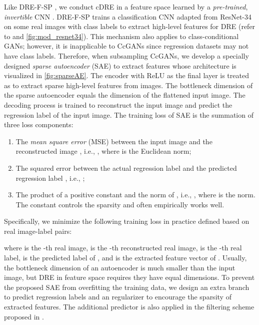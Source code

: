 \documentclass[final,12pt, 3p,times]{elsarticle}
\begin{document}
Like DRE-F-SP \cite{ding2020subsampling}, we conduct cDRE in a feature space learned by a \textit{pre-trained}, \textit{invertible} CNN . DRE-F-SP \cite{ding2020subsampling} trains a classification CNN adapted from ResNet-34 on some real images with class labels to extract high-level features for DRE (refer to  and \cref{fig:mod_resnet34}). This mechanism also applies to class-conditional GANs; however, it is inapplicable to CcGANs since regression datasets may not have class labels. Therefore, when subsampling CcGANs, we develop a specially designed \textit{sparse autoencoder} (SAE) to extract features whose architecture is visualized in \cref{fig:sparseAE}. The encoder with ReLU \cite{glorot2011deep} as the final layer is treated as  to extract sparse high-level features from images. The bottleneck dimension of the sparse autoencoder equals the dimension of the flattened input image. The decoding process is trained to reconstruct the input image and predict the regression label of the input image. The training loss of SAE is the summation of three loss components: 
\begin{enumerate}[(1)]
    \item The \textit{mean square error} (MSE) between the input image  and the reconstructed image , i.e., , where  is the Euclidean norm;
    
    \item The squared error between the actual regression label  and the predicted regression label , i.e., ;
    
    \item The product of a positive constant  and the  norm of , i.e., , where  is the  norm. The constant  controls the sparsity and  often empirically works well.
    
\end{enumerate}
Specifically, we minimize the following training loss  in practice defined based on  real image-label pairs:

where  is the -th real image,  is the -th reconstructed real image,  is the -th real label,  is the predicted label of , and  is the extracted feature vector of . Usually, the bottleneck dimension of an autoencoder is much smaller than the input image, but DRE in feature space \cite{ding2020subsampling} requires they have equal dimensions. To prevent the proposed SAE from overfitting the training data, we design an extra branch to predict regression labels and an  regularizer to encourage the sparsity of extracted features. The additional predictor is also applied in the filtering scheme proposed in .
\end{document}
